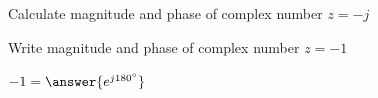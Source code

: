 \documentclass{ximera}
\begin{document}
\begin{example}
\begin{explanation}
\begin{image}
\end{image}


\end{explanation}


\end{example}


\begin{question}
Calculate magnitude and phase of 
complex number $z=-j$ 
\begin{multipleChoice}  
\end{multipleChoice}
\end{question}
  
  
  
  
  
  
  
  
  
  
  
  
  
  
  
  
  
  
  
  
  
  
  
  Write magnitude and phase of complex number $z=-1$
\begin{question}  
$-1 = \answer{e^{j180^\circ}}$
    \end{question} 
    
    
    
    
    
    
    
    
    
    
    
    
    
    
    
    
    
    
    
\end{document}
